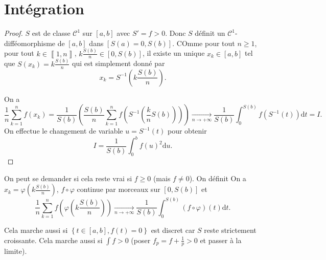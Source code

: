 \section{Intégration}

\begin{proof}
    $S$ est de classe $\mathcal{C}^{1}$ sur $[a,b]$ avec $S'=f>0$. Donc $S$ définit un $\mathcal{C}^{1}$-difféomorphisme de $[a,b]$ dans $[S(a)=0,S(b)]$. COmme pour tout $n\geqslant1$, pour tout $k\in\left\llbracket1,n\right\rrbracket$, $k\frac{S(b)}{n}\in[0,S(b)]$, il existe un unique $x_{k}\in[a,b]$ tel que $S(x_{k})=k\frac{S(b)}{n}$ qui est simplement donné par 
    \begin{equation}
        \boxed{
            x_{k}=S^{-1}\left(k\frac{S(b)}{n}\right).
        }
    \end{equation}

    On a 
    \begin{equation}
        \frac{1}{n}\sum_{k=1}^{n}f(x_{k})=\frac{1}{S(b)}\left(\frac{S(b)}{n}\sum_{k=1}^{n}f\left(S^{-1}\left(\frac{k}{n}S(b)\right)\right)\right)\xrightarrow[n\to+\infty]{}\frac{1}{S(b)}\int_{0}^{S(b)}f\left(S^{-1}(t)\right)\mathrm{d}t=I.
    \end{equation}
    On effectue le changement de variable $u=S^{-1}(t)$ pour obtenir
    \begin{equation}
        \boxed{
            I=\frac{1}{S(b)}\int_{0}^{b}f(u)^{2}\mathrm{d}u.
        }
    \end{equation}
\end{proof}

\begin{remark}
    On peut se demander si cela reste vrai si $f\geqslant0$ (mais $f\neq 0$). On définit 
    On a $x_{k}=\varphi\left(k\frac{S(b)}{n}\right)$, $f\circ \varphi$ continue par morceaux sur $[0,S(b)]$ et 
    \begin{equation}
        \frac{1}{n}\sum_{k=1}^{n}f\left(\varphi\left(k\frac{S(b)}{n}\right)\right)\xrightarrow[n\to+\infty]{}\frac{1}{S(b)}\int_{0}^{S(b)}\left(f\circ \varphi\right)(t)\mathrm{d}t.
    \end{equation}

    Cela marche aussi si $\left\lbrace t\in[a,b], f(t)=0\right\rbrace$ est discret car $S$ reste strictement croissante. Cela marche aussi si $\int f>0$ (poser $f_p=f+\frac{1}{p}>0$ et passer à la limite).
\end{remark}

